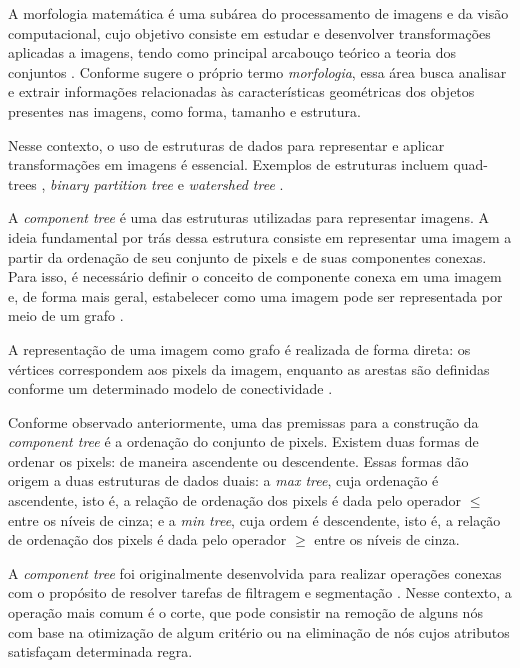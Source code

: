 A morfologia matemática é uma subárea do processamento de imagens e da
visão computacional, cujo objetivo consiste em estudar e desenvolver
transformações aplicadas a imagens, tendo como principal arcabouço teórico a
teoria dos conjuntos \cite{najman_graph-based_2014}. Conforme sugere o próprio
termo \textit{morfologia}, essa área busca analisar e extrair informações
relacionadas às características geométricas dos objetos presentes nas imagens,
como forma, tamanho e estrutura.

Nesse contexto, o uso de estruturas de dados para representar e aplicar
transformações em imagens é essencial. Exemplos de estruturas incluem
quad-trees \cite{tanimoto_hierarchical_1975, hunter_operations_1979},
\textit{binary partition tree} \cite{salembier_binary_2000} e
\textit{watershed tree} \cite{najman_geodesic_1996}.

A \textit{component tree} \cite{salembier_antiextensive_1998} é uma das
estruturas utilizadas para representar imagens. A ideia fundamental por trás
dessa estrutura consiste em representar uma imagem a partir da ordenação de
seu conjunto de pixels e de suas componentes conexas. Para isso, é necessário
definir o conceito de componente conexa em uma imagem
\cite{rosenfeld_connectivity_1970, perret_inf-structuring_2015} e, de forma
mais geral, estabelecer como uma imagem pode ser representada por meio de um
grafo \cite{najman_graph-based_2014}.

A representação de uma imagem como grafo é realizada de forma direta: os
vértices correspondem aos pixels da imagem, enquanto as arestas são definidas
conforme um determinado modelo de conectividade
\cite{rosenfeld_connectivity_1970}.

Conforme observado anteriormente, uma das premissas para a construção da
\textit{component tree} é a ordenação do conjunto de pixels. Existem duas
formas de ordenar os pixels: de maneira ascendente ou descendente. Essas
formas dão origem a duas estruturas de dados duais: a \textit{max tree}, cuja
ordenação é ascendente, isto é, a relação de ordenação dos pixels é dada pelo
operador $\le$ entre os níveis de cinza; e a \textit{min tree}, cuja ordem é
descendente, isto é, a relação de ordenação dos pixels é dada pelo operador
$\ge$ entre os níveis de cinza.

A \textit{component tree} foi originalmente desenvolvida para realizar
operações conexas com o propósito de resolver tarefas de filtragem e
segmentação \cite{salembier_flat_1995, salembier_connected_2009}. Nesse
contexto, a operação mais comum é o corte, que pode consistir na remoção de
alguns nós com base na otimização de algum critério ou na eliminação de nós
cujos atributos satisfaçam determinada regra.

